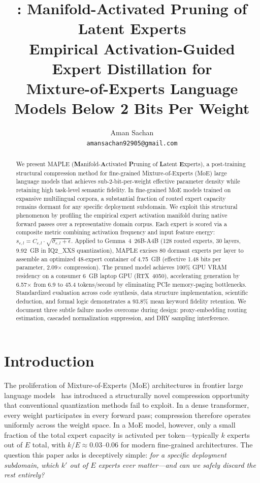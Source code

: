 \documentclass[10pt]{article}
\title{\MAPLE{}: Manifold-Activated Pruning of Latent Experts\\[0.3em]
\large Empirical Activation-Guided Expert Distillation for\\
Mixture-of-Experts Language Models Below 2 Bits Per Weight}
\author{Aman Sachan\\
\texttt{amansachan92905@gmail.com}}
\newcommand{\MAPLE}{\textsc{MAPLE}}
\begin{document}
\maketitle

\begin{abstract}
We present \MAPLE{} (\textbf{M}anifold-\textbf{A}ctivated \textbf{P}runing of \textbf{L}atent \textbf{E}xperts), a post-training structural compression method for fine-grained Mixture-of-Experts (MoE) large language models that achieves sub-2-bit-per-weight effective parameter density while retaining high task-level semantic fidelity. In fine-grained MoE models trained on expansive multilingual corpora, a substantial fraction of routed expert capacity remains dormant for any specific deployment subdomain. We exploit this structural phenomenon by profiling the empirical expert activation manifold during native forward passes over a representative domain corpus. Each expert is scored via a composite metric combining activation frequency and input feature energy: $s_{e,l} = C_{e,l} \cdot \sqrt{\bar{\sigma}_{e,l} + \epsilon}$. Applied to Gemma~4~26B-A4B (128 routed experts, 30 layers, 9.92~GB in IQ2\_XXS quantization), \MAPLE{} excises 80 dormant experts per layer to assemble an optimized 48-expert container of 4.75~GB (effective 1.48 bits per parameter, 2.09$\times$ compression). The pruned model achieves 100\% GPU VRAM residency on a consumer 6~GB laptop GPU (RTX~4050), accelerating generation by 6.57$\times$ from 6.9 to 45.4 tokens/second by eliminating PCIe memory-paging bottlenecks. Standardized evaluation across code synthesis, data structure implementation, scientific deduction, and formal logic demonstrates a 93.8\% mean keyword fidelity retention. We document three subtle failure modes overcome during design: proxy-embedding routing estimation, cascaded normalization suppression, and DRY sampling interference.
\end{abstract}

\section{Introduction}
\label{sec:intro}

The proliferation of Mixture-of-Experts (MoE) architectures in frontier large language models~\cite{jiang2024mixtral,dai2024deepseekmoe,team2025gemma} has introduced a structurally novel compression opportunity that conventional quantization methods fail to exploit. In a dense transformer, every weight participates in every forward pass; compression therefore operates uniformly across the weight space. In a MoE model, however, only a small fraction of the total expert capacity is activated per token---typically $k$ experts out of $E$ total, with $k/E \approx 0.03$--$0.06$ for modern fine-grained architectures. The question this paper asks is deceptively simple: \emph{for a specific deployment subdomain, which $k'$ out of $E$ experts ever matter---and can we safely discard the rest entirely?}
\end{document}
